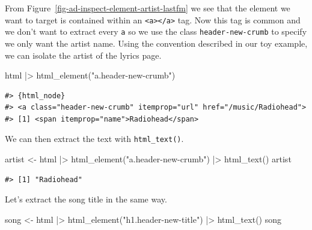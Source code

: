 \documentclass[
  letterpaper,
]{latex/krantz}
\newenvironment{Shaded}{\begin{snugshade}}{\end{snugshade}}
\newcommand{\FunctionTok}[1]{\textcolor[rgb]{0.28,0.35,0.67}{#1}}
\newcommand{\NormalTok}[1]{\textcolor[rgb]{0.00,0.23,0.31}{#1}}
\newcommand{\OtherTok}[1]{\textcolor[rgb]{0.00,0.23,0.31}{#1}}
\newcommand{\SpecialCharTok}[1]{\textcolor[rgb]{0.37,0.37,0.37}{#1}}
\newcommand{\StringTok}[1]{\textcolor[rgb]{0.13,0.47,0.30}{#1}}
\begin{document}
From Figure~\ref{fig-ad-inspect-element-artist-lastfm} we see that the
element we want to target is contained within an
\texttt{\textless{}a\textgreater{}\textless{}/a\textgreater{}} tag. Now
this tag is common and we don't want to extract every \texttt{a} so we
use the class \texttt{header-new-crumb} to specify we only want the
artist name. Using the convention described in our toy example, we can
isolate the artist of the lyrics page.

\begin{Shaded}
\begin{Highlighting}[]
\NormalTok{html }\SpecialCharTok{|\textgreater{}} 
  \FunctionTok{html\_element}\NormalTok{(}\StringTok{"a.header{-}new{-}crumb"}\NormalTok{)}
\end{Highlighting}
\end{Shaded}

\begin{verbatim}
#> {html_node}
#> <a class="header-new-crumb" itemprop="url" href="/music/Radiohead">
#> [1] <span itemprop="name">Radiohead</span>
\end{verbatim}

We can then extract the text with \texttt{html\_text()}.

\begin{Shaded}
\begin{Highlighting}[]
\NormalTok{artist }\OtherTok{\textless{}{-}} 
\NormalTok{  html }\SpecialCharTok{|\textgreater{}} 
  \FunctionTok{html\_element}\NormalTok{(}\StringTok{"a.header{-}new{-}crumb"}\NormalTok{) }\SpecialCharTok{|\textgreater{}} 
  \FunctionTok{html\_text}\NormalTok{()}
\NormalTok{artist}
\end{Highlighting}
\end{Shaded}

\begin{verbatim}
#> [1] "Radiohead"
\end{verbatim}

Let's extract the song title in the same way.

\begin{Shaded}
\begin{Highlighting}[]
\NormalTok{song }\OtherTok{\textless{}{-}} 
\NormalTok{  html }\SpecialCharTok{|\textgreater{}} 
  \FunctionTok{html\_element}\NormalTok{(}\StringTok{"h1.header{-}new{-}title"}\NormalTok{) }\SpecialCharTok{|\textgreater{}} 
  \FunctionTok{html\_text}\NormalTok{()}
\NormalTok{song}
\end{Highlighting}
\end{Shaded}
\end{document}
